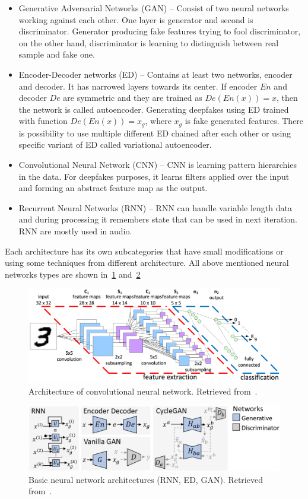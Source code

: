 \begin{itemize}
    \item Generative Adversarial Networks (GAN) – Consist of two neural networks working against each other. One layer is generator and second is discriminator. Generator producing fake features trying to fool discriminator, on the other hand, discriminator is learning to distinguish between real sample and fake one.
    \item Encoder-Decoder networks (ED) – Contains at least two networks, encoder and decoder. It has narrowed layers towards its center. If encoder \(En\) and decoder \(De\) are symmetric and they are trained as \(De(En(x)) = x\), then the network is called autoencoder. Generating deepfakes using ED trained with function \(De(En(x)) = x_g\), where \(x_g\) is fake generated features. There is possibility to use multiple different ED chained after each other or using specific variant of ED called variational autoencoder.
    \item Convolutional Neural Network (CNN) – CNN is learning pattern hierarchies in the data. For deepfakes purposes, it learns filters applied over the input and forming an abstract feature map as the output.
    \item Recurrent Neural Networks (RNN) – RNN can handle variable length data and during processing it remembers state that can be used in next iteration. RNN are mostly used in audio.
\end{itemize}

Each architecture has its own subcategories that have small modifications or using some techniques from different architecture. All above mentioned neural networks types are shown in~\ref{fig:nns_architecture} and~\ref{fig:cnn_architecture} 

\begin{figure}[H]
    \centering
    \includegraphics[width=.7\linewidth]{other-fig/cnn.png}
    \caption{Architecture of convolutional neural network. Retrieved from~\cite{CNNArchitecture}.}
    \label{fig:nns_architecture}
\end{figure}

\begin{figure}[H]
    \centering
    \includegraphics[width=.65\linewidth]{other-fig/nns.png}
    \caption{Basic neural network architectures (RNN, ED, GAN). Retrieved from~\cite{CreationandDetectionofDeepfakes}.}
    \label{fig:cnn_architecture}
\end{figure}

